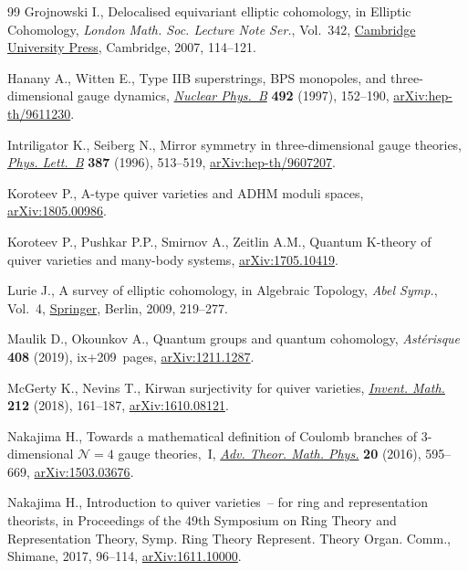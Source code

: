 \documentclass[pdftex]{sigma}
\numberwithin{equation}{section}
\begin{document}
\begin{thebibliography}{99}
Grojnowski I., Delocalised equivariant elliptic cohomology, in Elliptic
 Cohomology, \textit{London Math. Soc. Lecture Note Ser.}, Vol.~342, \href{https://doi.org/10.1017/CBO9780511721489.007}{Cambridge
 University Press}, Cambridge, 2007, 114--121.

Hanany A., Witten E., Type {IIB} superstrings, {BPS} monopoles, and
 three-dimensional gauge dynamics, \href{https://doi.org/10.1016/S0550-3213(97)00157-0}{\textit{Nuclear Phys.~B}} \textbf{492}
 (1997), 152--190, \href{https://arxiv.org/abs/hep-th/9611230}{arXiv:hep-th/9611230}.

Intriligator K., Seiberg N., Mirror symmetry in three-dimensional gauge
 theories, \href{https://doi.org/10.1016/0370-2693(96)01088-X}{\textit{Phys. Lett.~B}} \textbf{387} (1996), 513--519,
 \href{https://arxiv.org/abs/hep-th/9607207}{arXiv:hep-th/9607207}.

Koroteev P., A-type quiver varieties and ADHM moduli spaces,
 \href{https://arxiv.org/abs/1805.00986}{arXiv:1805.00986}.

Koroteev P., Pushkar P.P., Smirnov A., Zeitlin A.M., Quantum K-theory of quiver
 varieties and many-body systems, \href{https://arxiv.org/abs/1705.10419}{arXiv:1705.10419}.

Lurie J., A survey of elliptic cohomology, in Algebraic Topology, \textit{Abel
 Symp.}, Vol.~4, \href{https://doi.org/10.1007/978-3-642-01200-6_9}{Springer}, Berlin, 2009, 219--277.

Maulik D., Okounkov A., Quantum groups and quantum cohomology,
 \textit{Ast\'{e}risque} \textbf{408} (2019), ix+209~pages, \href{https://arxiv.org/abs/1211.1287}{arXiv:1211.1287}.

McGerty K., Nevins T., Kirwan surjectivity for quiver varieties,
 \href{https://doi.org/10.1007/s00222-017-0765-x}{\textit{Invent. Math.}} \textbf{212} (2018), 161--187, \href{https://arxiv.org/abs/1610.08121}{arXiv:1610.08121}.

Nakajima H., Towards a mathematical definition of {C}oulomb branches of
 3-dimensional {${\mathcal N}=4$} gauge theories,~{I}, \href{https://doi.org/10.4310/ATMP.2016.v20.n3.a4}{\textit{Adv. Theor.
 Math. Phys.}} \textbf{20} (2016), 595--669, \href{https://arxiv.org/abs/1503.03676}{arXiv:1503.03676}.

Nakajima H., Introduction to quiver varieties~-- for ring and representation
 theorists, in Proceedings of the 49th {S}ymposium on {R}ing {T}heory and
 {R}epresentation {T}heory, Symp. Ring Theory Represent. Theory Organ. Comm.,
 Shimane, 2017, 96--114, \href{https://arxiv.org/abs/1611.10000}{arXiv:1611.10000}.


\end{thebibliography}
\end{document}
